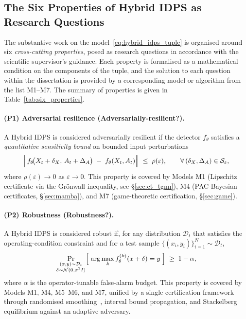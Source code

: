 \subsection{The Six Properties of Hybrid IDPS as Research Questions}
\label{subsec:six_properties}

The substantive work on the model~\eqref{eq:hybrid_idps_tuple} is
organised around six \emph{cross-cutting properties}, posed as
research questions in accordance with the scientific supervisor's
guidance. Each property is formalised as a mathematical condition on
the components of the tuple, and the solution to each question
within the dissertation is provided by a corresponding model or
algorithm from the list M1--M7. The summary of properties is given in
Table~\ref{tab:six_properties}.

\paragraph{(P1) Adversarial resilience (Adversarially-resilient?).}
A Hybrid IDPS is considered adversarially resilient if the detector
$f_\theta$ satisfies a \emph{quantitative sensitivity bound} on
bounded input perturbations
\begin{equation}
\Bigl\|f_\theta\!\bigl(X_t+\delta_X,\,A_t+\Delta_A\bigr)
\;-\; f_\theta(X_t, A_t)\Bigr\|
\;\le\; \rho(\varepsilon),
\qquad \forall\,(\delta_X,\Delta_A)\in\mathcal{S}_\varepsilon,
\label{eq:adv_resilient_property}
\end{equation}
where $\rho(\varepsilon)\to 0$ as $\varepsilon\to 0$. This property
is covered by Models M1 (Lipschitz certificate via the Grönwall
inequality, see \S\ref{sec:ct_tgnn}), M4 (PAC-Bayesian certificates,
\S\ref{sec:mamba}), and M7 (game-theoretic certification,
\S\ref{sec:game}).

\paragraph{(P2) Robustness (Robustness?).}
A Hybrid IDPS is considered robust if, for any distribution
$\mathcal{D}_t$ that satisfies the operating-condition constraint
and for a test sample $\{(x_i,y_i)\}_{i=1}^{N}\sim\mathcal{D}_t$,
\begin{equation}
\Pr_{\substack{(x,y)\sim\mathcal{D}_t \\ \delta\sim\mathcal{N}(0,\sigma^2 I)}}
\Bigl[\;\arg\max_k f_\theta^{(k)}(x+\delta) = y\;\Bigr]
\;\ge\; 1-\alpha,
\label{eq:robustness_property}
\end{equation}
where $\alpha$ is the operator-tunable false-alarm budget. This
property is covered by Models M1, M4, M5--M6, and M7, unified by a
single certification framework through randomised
smoothing~\cite{Cohen2019}, interval bound propagation, and
Stackelberg equilibrium against an adaptive adversary.

